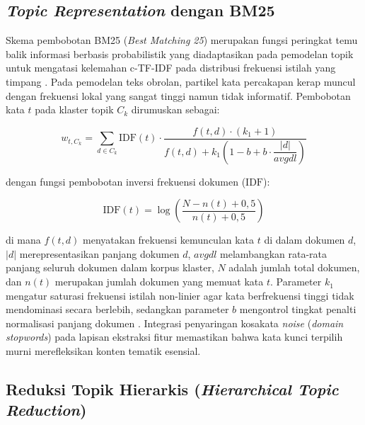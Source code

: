 \subsection{\textit{Topic Representation} dengan BM25}
\label{subsec:bm25}

Skema pembobotan BM25 (\textit{Best Matching 25}) merupakan fungsi peringkat temu balik informasi berbasis probabilistik yang diadaptasikan pada pemodelan topik untuk mengatasi kelemahan c-TF-IDF pada distribusi frekuensi istilah yang timpang \citep{doi.org/10.1111/coin.12248,iaes2025indobert}. Pada pemodelan teks obrolan, partikel kata percakapan kerap muncul dengan frekuensi lokal yang sangat tinggi namun tidak informatif. Pembobotan kata $t$ pada klaster topik $C_k$ dirumuskan sebagai:

\begin{equation}
    w_{t,C_k} = \sum_{d \in C_k} \mathrm{IDF}(t) \cdot \frac{f(t,d) \cdot (k_1 + 1)}{f(t,d) + k_1 \!\left(1 - b + b \cdot \dfrac{|d|}{\mathit{avgdl}}\right)}
    \label{eq:bm25-cluster}
\end{equation}

\noindent dengan fungsi pembobotan inversi frekuensi dokumen ($\mathrm{IDF}$):

\begin{equation}
    \mathrm{IDF}(t) = \log\!\left(\frac{N - n(t) + 0{,}5}{n(t) + 0{,}5}\right)
    \label{eq:idf-bm25}
\end{equation}

\noindent di mana $f(t,d)$ menyatakan frekuensi kemunculan kata $t$ di dalam dokumen $d$, $|d|$ merepresentasikan panjang dokumen $d$, $\mathit{avgdl}$ melambangkan rata-rata panjang seluruh dokumen dalam korpus klaster, $N$ adalah jumlah total dokumen, dan $n(t)$ merupakan jumlah dokumen yang memuat kata $t$. Parameter $k_1$ mengatur saturasi frekuensi istilah non-linier agar kata berfrekuensi tinggi tidak mendominasi secara berlebih, sedangkan parameter $b$ mengontrol tingkat penalti normalisasi panjang dokumen \citep{doi.org/10.1111/coin.12248}. Integrasi penyaringan kosakata \textit{noise} (\textit{domain stopwords}) pada lapisan ekstraksi fitur memastikan bahwa kata kunci terpilih murni merefleksikan konten tematik esensial.

\subsection{Reduksi Topik Hierarkis (\textit{Hierarchical Topic Reduction})}
\label{subsec:topic-reduction}

